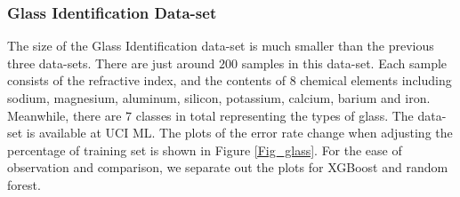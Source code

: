 \documentclass[twoside,11pt]{article}
\begin{document}
\subsubsection{Glass Identification Data-set}
The size of the Glass Identification data-set is much smaller than the previous three data-sets. There are just around $200$ samples in this data-set. Each sample consists of the refractive index, and the contents of $8$ chemical elements including sodium, magnesium, aluminum, silicon, potassium, calcium, barium and iron. Meanwhile, there are $7$ classes in total representing the types of glass. The data-set is available at UCI ML. The plots of the error rate change when adjusting the percentage of training set is shown in Figure \ref{Fig_glass}. For the ease of observation and comparison, we separate out the plots for XGBoost and random forest. 
\end{document}
